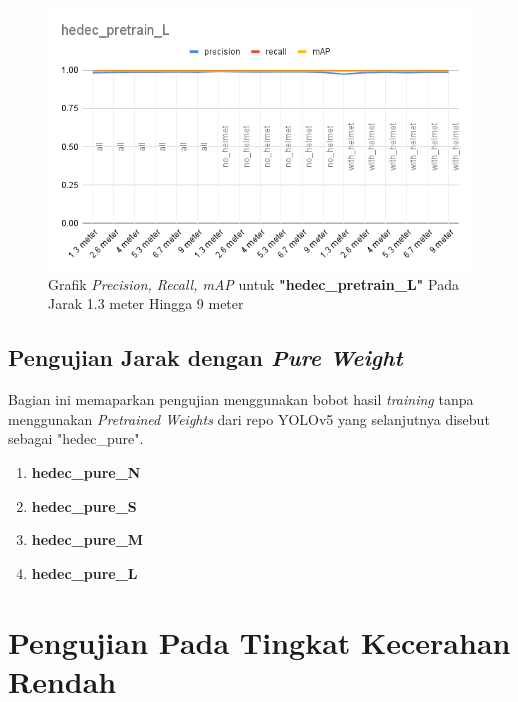 \begin{enumerate}
  \begin{figure}[ht]
    \centering
    \includegraphics[width=1\textwidth]{gambar/BerdasarkanJarak/hedec_pretrain_L.png}
    \caption{Grafik \emph{Precision, Recall, mAP} untuk \textbf{"hedec\_pretrain\_L"} Pada Jarak 1.3 meter Hingga 9 meter}
    \label{fig:grafvaljarak_hedec_pretrain_L}  
  \end{figure}

\end{enumerate}

\subsection{Pengujian Jarak dengan \emph{Pure Weight}}
\label{subsec:ujijarak_pureweight}

\par Bagian ini memaparkan pengujian menggunakan bobot hasil \emph{training} tanpa menggunakan \emph{Pretrained Weights}
dari repo YOLOv5 yang selanjutnya disebut sebagai "hedec\_pure". 

\begin{enumerate}
  \item \textbf{hedec\_pure\_N}
  \item \textbf{hedec\_pure\_S}
  \item \textbf{hedec\_pure\_M}
  \item \textbf{hedec\_pure\_L}
\end{enumerate}


\newpage

\section{Pengujian Pada Tingkat Kecerahan Rendah}
\label{sec:pengujianberdasarkantingkatkeceharan}

